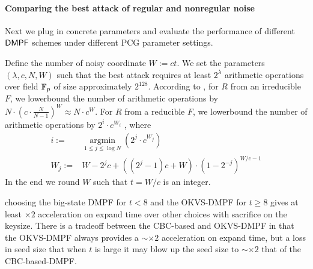 
\paragraph{Comparing the best attack of regular and nonregular noise}Next we plug in concrete parameters and evaluate the performance of different ${\sf DMPF}$ schemes under different PCG parameter settings. 

Define the number of noisy coordinate $W:=ct$. We set the parameters $(\lambda, c, N, W)$ such that the best attack requires at least $2^\lambda$ arithmetic operations over field $\mathbb{F}_p$ of size approximately $2^{128}$. According to \cite{cryptoeprint:2022/1035}, for $R$ from an irreducible $F$, we lowerbound the number of arithmetic operations by $N\cdot (c\cdot \frac{N}{N-1})^W\approx N\cdot c^W$.  For $R$ from a reducible $F$, we lowerbound the number of arithmetic operations by $2^i\cdot c^{W_i}$ , where 
\[
  \begin{split}
    i:=&\mathop{\arg\min}\limits_{1\le j\le \log N}\left(2^j\cdot c^{W_j}\right)\\ W_j:=&W-2^jc+((2^j-1)c+W)\cdot \left(1-2^{-j}\right)^{W/c-1}
  \end{split}
\]
 In the end we round $W$ such that $t=W/c$ is an integer. 


 choosing the big-state DMPF for $t<8$ and the OKVS-DMPF for $t\ge 8$ gives at least $\times 2$ acceleration on expand time over other choices with sacrifice on the keysize. There is a tradeoff between the CBC-based and OKVS-DMPF in that the OKVS-DMPF always provides a $\sim\times 2$ acceleration on expand time, but a loss in seed size that when $t$ is large it may blow up the seed size to $\sim \times 2$ that of the CBC-based-DMPF. 

